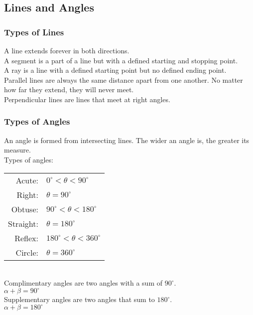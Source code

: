 \subsection{Lines and Angles}

\subsubsection{Types of Lines}
A line extends forever in both directions.\\
A segment is a part of a line but with a defined starting and stopping point.\\
A ray is a line with a defined starting point but no defined ending point.\\
Parallel lines are always the same distance apart from one another. No matter how far they extend, they will never meet.\\
Perpendicular lines are lines that meet at right angles.

\subsubsection{Types of Angles}
An angle is formed from intersecting lines. The wider an angle is, the greater its measure.\\
Types of angles:\\
\begin{tabular}{rl}
Acute: & $0^\circ <\theta < 90^\circ$\\
Right: & $\theta = 90^\circ$\\
Obtuse: & $90^\circ < \theta < 180^\circ$\\
Straight: & $\theta = 180^\circ$\\
Reflex: & $180^\circ < \theta < 360^\circ$\\
Circle: & $\theta=360^\circ$
\end{tabular}\\
Complimentary angles are two angles with a sum of $90^\circ$.\\
$\alpha+\beta=90^\circ$\\
Supplementary angles are two angles that sum to $180^\circ$.\\
$\alpha+\beta=180^\circ$

